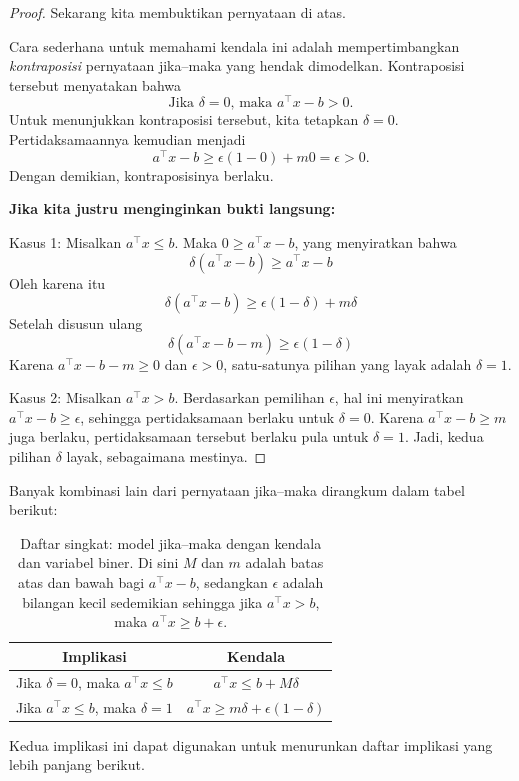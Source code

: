 \begin{proof}Sekarang kita membuktikan pernyataan di atas.

Cara sederhana untuk memahami kendala ini adalah mempertimbangkan \emph{kontraposisi} pernyataan jika--maka yang hendak dimodelkan. Kontraposisi tersebut menyatakan bahwa
\begin{equation}
\text{Jika $\delta = 0$, maka $a^\top x - b > 0$.}
\end{equation}
Untuk menunjukkan kontraposisi tersebut, kita tetapkan $\delta = 0$. Pertidaksamaannya kemudian menjadi
$$
a^\top x - b \geq \epsilon(1-0) + m0 = \epsilon > 0.
$$
Dengan demikian, kontraposisinya berlaku.

\textbf{Jika kita justru menginginkan bukti langsung:}

Kasus 1: Misalkan $a^\top x \leq b$. Maka $0 \geq a^\top x - b$, yang menyiratkan bahwa
$$
\delta(a^\top x - b) \geq a^\top x - b
$$
Oleh karena itu
$$
\delta(a^\top x - b) \geq \epsilon(1-\delta) + m \delta
$$
Setelah disusun ulang
$$
\delta(a^\top x - b - m) \geq \epsilon(1-\delta)
$$
Karena $a^\top x - b - m \geq 0$ dan $\epsilon > 0$, satu-satunya pilihan yang layak adalah $\delta = 1$.


Kasus 2: Misalkan $a^\top x > b$. Berdasarkan pemilihan $\epsilon$, hal ini menyiratkan $a^\top x - b \geq \epsilon$, sehingga pertidaksamaan berlaku untuk $\delta = 0$. Karena $a^\top x - b \geq m$ juga berlaku, pertidaksamaan tersebut berlaku pula untuk $\delta = 1$. Jadi, kedua pilihan $\delta$ layak, sebagaimana mestinya.
\end{proof}

Banyak kombinasi lain dari pernyataan jika--maka dirangkum dalam tabel berikut:
\begin{table}
\begin{center}
\begin{tabular}{|c|c|}
\hline
\textbf{Implikasi} & \textbf{Kendala}\\
\hline
Jika $\delta = 0$, maka $a^\top x \leq b$ & $a^\top x \leq b + M \delta$\\
Jika $a^\top x \leq b$, maka $\delta = 1$ & $a^\top x \geq m \delta + \epsilon(1-\delta)$\\
\hline
\end{tabular}
\end{center}
\caption{Daftar singkat: model jika--maka dengan kendala dan variabel biner. Di sini $M$ dan $m$ adalah batas atas dan bawah bagi $a^\top x - b$, sedangkan $\epsilon$ adalah bilangan kecil sedemikian sehingga jika $a^\top x > b$, maka $a^\top x \geq b + \epsilon$.}
\end{table}
Kedua implikasi ini dapat digunakan untuk menurunkan daftar implikasi yang lebih panjang berikut.

